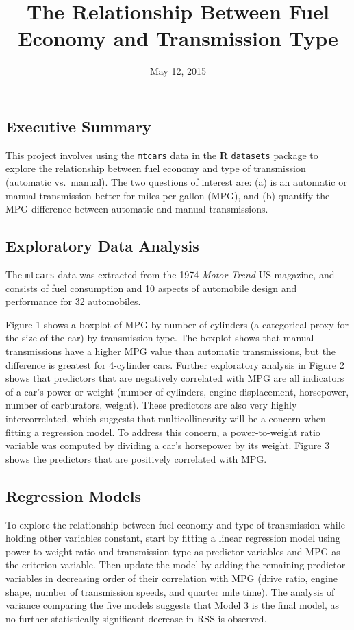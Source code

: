 \documentclass[]{article}
\title{The Relationship Between Fuel Economy and Transmission Type}
\author{}
\date{May 12, 2015}
\begin{document}
\maketitle


\subsection{Executive Summary}\label{executive-summary}

This project involves using the \texttt{mtcars} data in the \textbf{R}
\texttt{datasets} package to explore the relationship between fuel
economy and type of transmission (automatic vs.~manual). The two
questions of interest are: (a) is an automatic or manual transmission
better for miles per gallon (MPG), and (b) quantify the MPG difference
between automatic and manual transmissions.

\subsection{Exploratory Data Analysis}\label{exploratory-data-analysis}

The \texttt{mtcars} data was extracted from the 1974 \emph{Motor Trend}
US magazine, and consists of fuel consumption and 10 aspects of
automobile design and performance for 32 automobiles.

Figure 1 shows a boxplot of MPG by number of cylinders (a categorical
proxy for the size of the car) by transmission type. The boxplot shows
that manual transmissions have a higher MPG value than automatic
transmissions, but the difference is greatest for 4-cylinder cars.
Further exploratory analysis in Figure 2 shows that predictors that are
negatively correlated with MPG are all indicators of a car's power or
weight (number of cylinders, engine displacement, horsepower, number of
carburators, weight). These predictors are also very highly
intercorrelated, which suggests that multicollinearity will be a concern
when fitting a regression model. To address this concern, a
power-to-weight ratio variable was computed by dividing a car's
horsepower by its weight. Figure 3 shows the predictors that are
positively correlated with MPG.

\subsection{Regression Models}\label{regression-models}

To explore the relationship between fuel economy and type of
transmission while holding other variables constant, start by fitting a
linear regression model using power-to-weight ratio and transmission
type as predictor variables and MPG as the criterion variable. Then
update the model by adding the remaining predictor variables in
decreasing order of their correlation with MPG (drive ratio, engine
shape, number of transmission speeds, and quarter mile time). The
analysis of variance comparing the five models suggests that Model 3 is
the final model, as no further statistically significant decrease in RSS
is observed.
\end{document}
